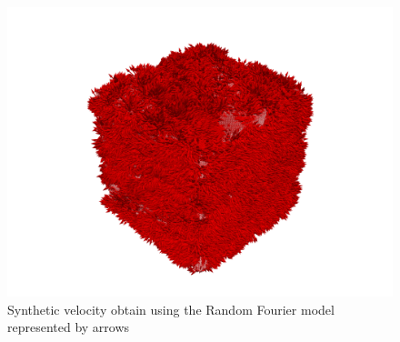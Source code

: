\documentclass[a4paper,12pt]{article}
\theoremstyle{definition}
\begin{document}
\begin{figure}[H]
    \centering
    \includegraphics[width=\linewidth]{illustrations/VelocityFieldVTU.png}
    \caption{Synthetic velocity obtain using the Random Fourier model represented by arrows}
\end{figure}
\end{document}
